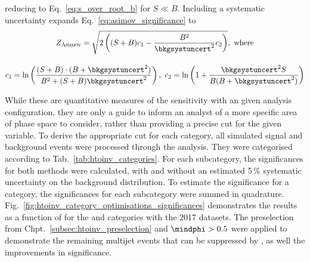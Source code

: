 reducing to Eq.~\ref{eq:s_over_root_b} for $S \ll B$. Including a systematic uncertainty expands Eq.~\ref{eq:asimov_significance} to
\begin{equation}
    \begin{gathered}  %
Z_{\mathrm{Asimov}} = \sqrt{2 \left( (S + B) c_1 - \frac{B^2}{\bkgsystuncert^2}c_2 \right)}, \ \text{where} \\[1em]
c_1 = \ln\left( \frac{(S + B) \cdot (B + \bkgsystuncert^2)}{B^2 + (S + B)\bkgsystuncert^2} \right), \ c_2 = \ln\left( 1 + \frac{\bkgsystuncert^2 S}{B(B + \bkgsystuncert^2)} \right)
    \end{gathered}
\label{eq:asimov_significance_systs}
\end{equation}

While these are quantitative measures of the sensitivity with an given analysis configuration, they are only a guide to inform an analyst of a more specific area of phase space to consider, rather than providing a precise cut for the given variable. To derive the appropriate cut for each category, all simulated signal and background events were processed through the analysis. They were categorised according to Tab.~\ref{tab:htoinv_categories}. For each subcategory, the significances for both methods were calculated, with and without an estimated 5\,\% systematic uncertainty on the background distribution. To estimate the significance for a category, the significances for each subcategory were summed in quadrature. Fig.~\ref{fig:htoinv_category_optimisations_significances} demonstrates the results as a function of \omegaTilde for the \ttH and \VH categories with the 2017 datasets. The preselection from Chpt.~\ref{subsec:htoinv_preselection} and $\mindphi > \text{0.5}$ were applied to demonstrate the remaining multijet events that can be suppressed by \omegaTilde, as well the improvements in significance.

